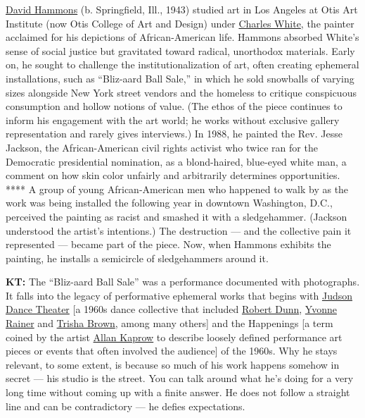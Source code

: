 \href{https://www.nytimes.com/2018/02/09/t-magazine/art/steve-cannon-david-hammons.html}{David
Hammons} (b. Springfield, Ill., 1943) studied art in Los Angeles at Otis
Art Institute (now Otis College of Art and Design) under
\href{https://www.nytimes.com/1979/10/06/archives/charles-w-white-is-dead-at-61-artist-with-work-in-49-museums.html}{Charles
White}, the painter acclaimed for his depictions of African-American
life. Hammons absorbed White's sense of social justice but gravitated
toward radical, unorthodox materials. Early on, he sought to challenge
the institutionalization of art, often creating ephemeral installations,
such as ``Bliz-aard Ball Sale,'' in which he sold snowballs of varying
sizes alongside New York street vendors and the homeless to critique
conspicuous consumption and hollow notions of value. (The ethos of the
piece continues to inform his engagement with the art world; he works
without exclusive gallery representation and rarely gives interviews.)
In 1988, he painted the Rev. Jesse Jackson, the African-American civil
rights activist who twice ran for the Democratic presidential
nomination, as a blond-haired, blue-eyed white man, a comment on how
skin color unfairly and arbitrarily determines opportunities. **** A
group of young African-American men who happened to walk by as the work
was being installed the following year in downtown Washington, D.C.,
perceived the painting as racist and smashed it with a sledgehammer.
(Jackson understood the artist's intentions.) The destruction --- and
the collective pain it represented --- became part of the piece. Now,
when Hammons exhibits the painting, he installs a semicircle of
sledgehammers around it.

\textbf{KT:} The ``Bliz-aard Ball Sale'' was a performance documented
with photographs. It falls into the legacy of performative ephemeral
works that begins with
\href{https://www.nytimes.com/2019/03/20/t-magazine/postmodern-dance.html}{Judson
Dance Theater} {[}a 1960s dance collective that included
\href{https://www.nytimes.com/1996/07/15/arts/robert-ellis-dunn-67-a-pioneer-in-postmodern-dance-movement.html}{Robert
Dunn},
\href{https://www.nytimes.com/2017/06/16/arts/dance/seven-seconds-of-yvonne-rainer-trio-a.html}{Yvonne
Rainer} and
\href{https://www.nytimes.com/2017/03/20/arts/dance/trisha-brown-dead-modern-dance-choreographer.html}{Trisha
Brown}, among many others{]} and the Happenings {[}a term coined by the
artist
\href{https://www.nytimes.com/2006/04/10/arts/design/allan-kaprow-creator-of-artistic-happenings-dies-at-78.html}{Allan
Kaprow} to describe loosely defined performance art pieces or events
that often involved the audience{]} of the 1960s. Why he stays relevant,
to some extent, is because so much of his work happens somehow in secret
--- his studio is the street. You can talk around what he's doing for a
very long time without coming up with a finite answer. He does not
follow a straight line and can be contradictory --- he defies
expectations.

